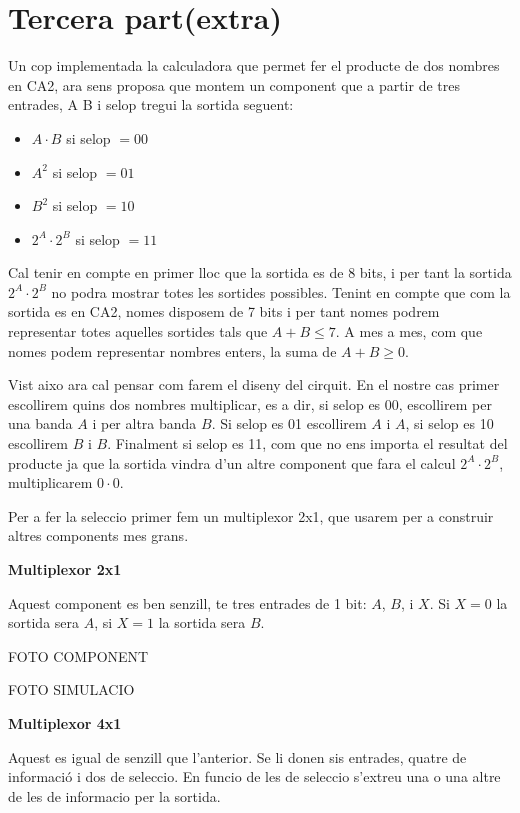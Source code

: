 \documentclass[12pt, a4papre]{article}
\begin{document}
	\newpage
	\section{Tercera part(extra)}
	
	Un cop implementada la calculadora que permet fer el producte de dos nombres en CA2, ara sens proposa que montem un component que a partir de tres entrades, A B i selop tregui la sortida seguent:
	
	\begin{itemize}
	\item $A\cdot B$ si selop $=00$
	\item $A^2$ si selop $=01$
	\item $B^2$ si selop $=10$
	\item$2^A\cdot2^B$ si selop $=11$
	\end{itemize}
	
	Cal tenir en compte en primer lloc que la sortida es de 8 bits, i per tant la sortida $2^A\cdot2^B$ no podra mostrar totes les sortides possibles. Tenint en compte que com la sortida es en CA2, nomes disposem de 7 bits i per tant nomes podrem representar totes aquelles sortides tals que $A+B \leqslant 7$. A mes a mes, com que nomes podem representar nombres enters, la suma de $A+B \geqslant 0$. 
	
	Vist aixo ara cal pensar com farem el diseny del cirquit. En el nostre cas primer escollirem quins dos nombres multiplicar, es a dir, si selop es 00, escollirem per una banda $A$ i per altra banda $B$. Si selop es 01 escollirem $A$ i $A$, si selop es 10 escollirem $B$ i $B$. Finalment si selop es 11, com que no ens importa el resultat del producte ja que la sortida vindra d'un altre component que fara el calcul $2^A\cdot2^B$, multiplicarem $0\cdot 0$.
	
	Per a fer la seleccio primer fem un multiplexor 2x1, que usarem per a construir altres components mes grans.
	
	\textbf{\large{Multiplexor 2x1}}
	
	Aquest component es ben senzill, te tres entrades de 1 bit: $A$, $B$, i $X$. Si $X=0$ la sortida sera $A$, si $X=1$ la sortida sera $B$.
	
	\begin{center}
		FOTO COMPONENT
		
		FOTO SIMULACIO
	\end{center}
	
	\textbf{\large{Multiplexor 4x1}}
	
	Aquest es igual de senzill que l'anterior. Se li donen sis entrades, quatre de informació i dos de seleccio. En funcio de les de seleccio s'extreu una  o una altre de les de informacio per la sortida.
	
\end{document}
